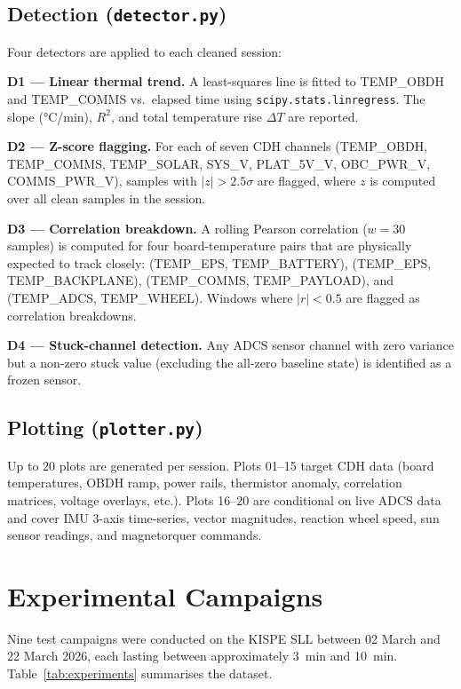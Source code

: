 \documentclass[conference]{IEEEtran}
\begin{document}
\subsection{Detection (\texttt{detector.py})}

Four detectors are applied to each cleaned session:

\textbf{D1 — Linear thermal trend.}  A least-squares line is fitted
to TEMP\_OBDH and TEMP\_COMMS vs.\ elapsed time using
\texttt{scipy.stats.linregress}.  The slope (°C/min), $R^2$, and
total temperature rise $\Delta T$ are reported.

\textbf{D2 — Z-score flagging.}  For each of seven CDH channels
(TEMP\_OBDH, TEMP\_COMMS, TEMP\_SOLAR, SYS\_V, PLAT\_5V\_V,
OBC\_PWR\_V, COMMS\_PWR\_V), samples with $|z| > 2.5\sigma$ are
flagged, where $z$ is computed over all clean samples in the session.

\textbf{D3 — Correlation breakdown.}  A rolling Pearson correlation
($w = 30$ samples) is computed for four board-temperature pairs that
are physically expected to track closely:
(TEMP\_EPS, TEMP\_BATTERY),
(TEMP\_EPS, TEMP\_BACKPLANE),
(TEMP\_COMMS, TEMP\_PAYLOAD), and
(TEMP\_ADCS, TEMP\_WHEEL).
Windows where $|r| < 0.5$ are flagged as correlation breakdowns.

\textbf{D4 — Stuck-channel detection.}  Any ADCS sensor channel with
zero variance but a non-zero stuck value (excluding the all-zero
baseline state) is identified as a frozen sensor.

\subsection{Plotting (\texttt{plotter.py})}

Up to 20 plots are generated per session.  Plots 01–15 target CDH
data (board temperatures, OBDH ramp, power rails, thermistor
anomaly, correlation matrices, voltage overlays, etc.).  Plots 16–20
are conditional on live ADCS data and cover IMU 3-axis time-series,
vector magnitudes, reaction wheel speed, sun sensor readings, and
magnetorquer commands.

\section{Experimental Campaigns}
\label{sec:experiments}

Nine test campaigns were conducted on the KISPE SLL between
02 March and 22 March 2026, each lasting between approximately
\SI{3}{\minute} and \SI{10}{\minute}.
Table~\ref{tab:experiments} summarises the dataset.
\end{document}
